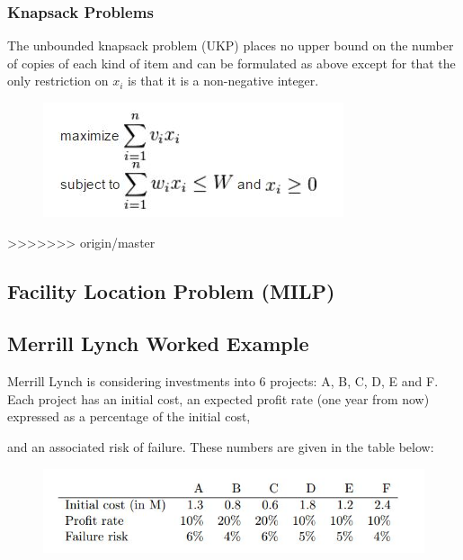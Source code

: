\documentclass{beamer}
\begin{document}
\begin{frame}
	\frametitle{Knapsack Problems}
	\Large
The unbounded knapsack problem (UKP) places no upper bound on the number of copies of each kind of item and can be formulated as above except for that the only restriction on $x_i$ is that it is a non-negative integer.
	\begin{figure}
\centering
\includegraphics[width=0.9\linewidth]{unboundedknapsack}

\end{figure}

\end{frame}
>>>>>>> origin/master
\subsection{ Facility Location Problem (MILP) }
\begin{frame}
\end{frame}
\subsection{ Merrill Lynch Worked Example}
\begin{frame}
	Merrill Lynch is considering investments into 6 projects: A, B, C, D, E and F. Each project has an
	initial cost, an expected profit rate (one year from now) expressed as a percentage of the initial cost,

	and an associated risk of failure. These numbers are given in the table below:
\begin{figure}
\centering
\includegraphics[width=0.9\linewidth]{MErrillLynchExample}

\end{figure}

\end{frame}
\end{document}
